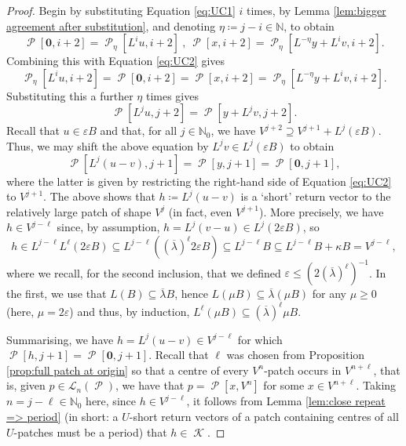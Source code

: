 \documentclass[11pt]{amsart}
\numberwithin{equation}{section}
\theoremstyle{plain}
\theoremstyle{definition}
\newcommand{\N}{\mathbb N}
\renewcommand{\epsilon}{\varepsilon}
\DeclareMathOperator{\cP}{\mathcal{P}}
\DeclareMathOperator{\cK}{\mathcal{K}}
\newcommand{\lang}{\mathscr{L}}
\begin{document}
\begin{proof}
Begin by substituting Equation \ref{eq:UC1} \(i\) times, by Lemma \ref{lem:bigger agreement after substitution}, and denoting \(\eta \coloneqq j-i \in \N\), to obtain
\begin{equation}\label{eq:UC4}
\cP[\mathbf{0},i+2] = \cP_\eta[L^i u,i+2]\ , \ \cP[x,i+2] = \cP_\eta[L^{-\eta} y + L^i v,i+2] .
\end{equation}
Combining this with Equation \ref{eq:UC2} gives
\begin{equation}\label{eq:UC5}
\cP_\eta[L^i u,i+2] = \cP[\mathbf{0},i+2] = \cP[x,i+2] = \cP_\eta[L^{-\eta} y + L^i v,i+2] .
\end{equation}
Substituting this a further \(\eta\) times gives
\[
\cP[L^j u,j+2] = \cP[y + L^j v,j+2] .
\]
Recall that \(u \in \epsilon B\) and that, for all \(j \in \N_0\), we have \(V^{j+2} \supseteq V^{j+1} + L^j(\epsilon B)\). Thus, we may shift the above equation by \(L^j v \in L^j(\epsilon B)\) to obtain
\begin{equation}
\cP[L^j(u-v),j+1] = \cP[y,j+1] = \cP[\mathbf{0},j+1] ,
\end{equation}
where the latter is given by restricting the right-hand side of Equation \ref{eq:UC2} to \(V^{j+1}\). The above shows that \(h \coloneqq L^j(u-v)\) is a `short' return vector to the relatively large patch of shape \(V^j\) (in fact, even \(V^{j+1}\)). More precisely, we have \(h \in V^{j-\ell}\) since, by assumption, \(h = L^j(v - u) \in L^j(2\epsilon B)\), so
\[
h \in L^{j-\ell}L^\ell(2\epsilon B) \subseteq L^{j-\ell}((\overline{\lambda})^\ell 2\epsilon B) \subseteq L^{j-\ell} B \subseteq L^{j-\ell} B + \kappa B = V^{j-\ell} ,
\]
where we recall, for the second inclusion, that we defined \(\epsilon \leq (2(\overline{\lambda})^\ell)^{-1}\). In the first, we use that \(L(B) \subseteq \overline{\lambda}B\), hence \(L(\mu B) \subseteq \overline{\lambda}(\mu B)\) for any \(\mu \geq 0\) (here, \(\mu = 2\epsilon\)) and thus, by induction, \(L^\ell(\mu B) \subseteq (\overline{\lambda})^\ell \mu B\).

Summarising, we have \(h = L^j(u-v) \in V^{j-\ell}\) for which \(\cP[h,j+1] = \cP[\mathbf{0},j+1]\). Recall that \(\ell\) was chosen from Proposition \ref{prop:full patch at origin} so that a centre of every \(V^n\)-patch occurs in \(V^{n+\ell}\), that is, given \(p \in \lang_n(\cP)\), we have that \(p = \cP[x,V^n]\) for some \(x \in V^{n+\ell}\). Taking \(n = j-\ell \in \N_0\) here, since \(h \in V^{j-\ell}\), it follows from Lemma \ref{lem:close repeat => period} (in short: a \(U\)-short return vectors of a patch containing centres of all \(U\)-patches must be a period) that \(h \in \cK\).


\end{proof}
\end{document}
